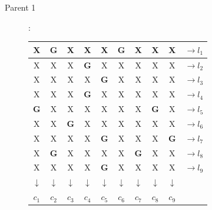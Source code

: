                     \begin{description}
                        \item[Parent 1]:\\
                            \begin{center}
                                \begin{tabular}{|c|c|c| |c|c|c| |c|c|c| |l}
                                    \hline
                                    X&\textbf{G}&X&X&X&\textbf{G}&X&X&X&$\rightarrow l_1$\\
                                    \hline
                                    X&X&X&\textbf{G}&X&X&X&X&X&$\rightarrow l_2$\\
                                    \hline
                                    X&X&X&X&\textbf{G}&X&X&X&X&$\rightarrow l_3$\\
                                    \hline
                                    \hline
                                    X&X&X&\textbf{G}&X&X&X&X&X&$\rightarrow l_4$\\
                                    \hline
                                    \textbf{G}&X&X&X&X&X&X&\textbf{G}&X&$\rightarrow l_5$\\
                                    \hline
                                    X&X&\textbf{G}&X&X&X&X&X&X&$\rightarrow l_6$\\
                                    \hline
                                    \hline
                                    X&X&X&X&\textbf{G}&X&X&X&\textbf{G}&$\rightarrow l_7$\\
                                    \hline
                                    X&\textbf{G}&X&X&X&X&\textbf{G}&X&X&$\rightarrow l_8$\\
                                    \hline
                                    X&X&X&X&\textbf{G}&X&X&X&X&$\rightarrow l_9$\\
                                    \hline
                                    \hline
                                    $\downarrow$&$\downarrow$&$\downarrow$&$\downarrow$&$\downarrow$&$\downarrow$&$\downarrow$&$\downarrow$&$\downarrow$&\\
                                    $c_1$&$c_2$&$c_3$&$c_4$&$c_5$&$c_6$&$c_7$&$c_8$&$c_9$&\\
                                \end{tabular}
                            \end{center}

\end{description}
